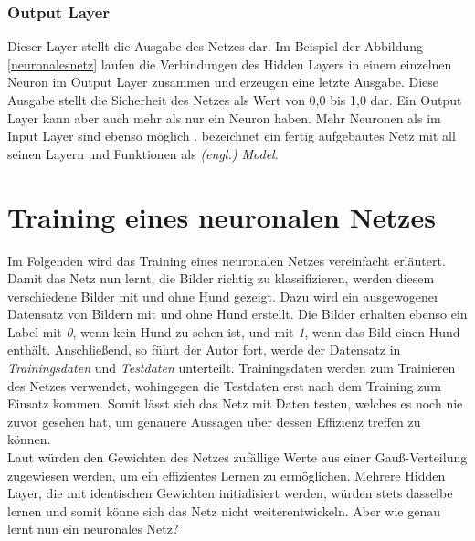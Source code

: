 \subsubsection*{Output Layer} Dieser Layer stellt die Ausgabe des Netzes dar. Im Beispiel der Abbildung \ref{neuronalesnetz} laufen die Verbindungen des Hidden Layers in einem einzelnen Neuron im Output Layer zusammen und erzeugen eine letzte Ausgabe. Diese Ausgabe stellt die Sicherheit des Netzes als Wert von 0,0 bis 1,0 dar. Ein Output Layer kann aber auch mehr als nur ein Neuron haben. Mehr Neuronen als im Input Layer sind ebenso möglich \parencite[]{kukreja2016introduction}. \citet[36]{traiq_neuron} bezeichnet ein fertig aufgebautes Netz mit all seinen Layern und Funktionen als \textit{(engl.) Model}.


\section{Training eines neuronalen Netzes}
Im Folgenden wird das Training eines neuronalen Netzes vereinfacht erläutert. Damit das Netz nun lernt, die Bilder richtig zu klassifizieren, werden diesem verschiedene Bilder mit und ohne Hund gezeigt. Dazu wird ein ausgewogener Datensatz von Bildern mit und ohne Hund erstellt. Die Bilder erhalten ebenso ein Label mit \textit{0}, wenn kein Hund zu sehen ist, und mit \textit{1}, wenn das Bild einen Hund enthält. Anschließend, so führt der Autor fort, werde der Datensatz in \textit{Trainingsdaten} und \textit{Testdaten} unterteilt. Trainingsdaten werden zum Trainieren des Netzes verwendet, wohingegen die Testdaten erst nach dem Training zum Einsatz kommen. Somit lässt sich das Netz mit Daten testen, welches es noch nie zuvor gesehen hat, um genauere Aussagen über dessen Effizienz treffen zu können.\\

Laut \citet[302]{GoodBengCour16} würden den Gewichten des Netzes zufällige Werte aus einer Gauß-Verteilung zugewiesen werden, um ein effizientes Lernen zu ermöglichen. Mehrere Hidden Layer, die mit identischen Gewichten initialisiert werden, würden stets dasselbe lernen und somit könne sich das Netz nicht weiterentwickeln. Aber wie genau lernt nun ein neuronales Netz?\\

